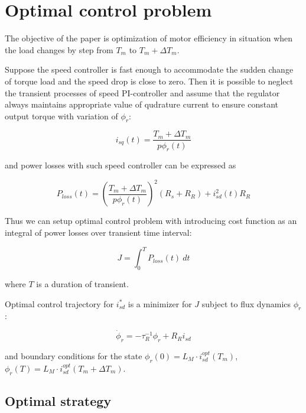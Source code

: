 \documentclass[journal]{IEEEtran}
\begin{document}
\section{Optimal control problem}

The objective of the paper is optimization of motor efficiency in situation when the load changes by step from $T_m$ to $T_m + \Delta T_m$.

Suppose the speed controller is fast enough to accommodate the sudden change of torque load and the speed drop is close to zero. Then it is possible to neglect the transient processes of speed PI-controller and assume that the regulator always maintains appropriate value of qudrature current to ensure constant output torque with variation of $\phi_r$:

\begin{equation}\label{eq:speed_ctrl}
 i_{sq}(t) = \frac{T_m+\Delta T_m}{p \phi_r(t)} 
\end{equation}

and power losses with such speed controller can be expressed as

\begin{equation}\label{eq:P_loss}
P_{loss}(t) = \left ( \frac{T_m+\Delta T_m}{p \phi_r(t)} \right )^2 (R_s + R_R) + i_{sd}^2(t) R_R
\end{equation}

Thus we can setup optimal control problem with introducing cost function as an integral of power losses over transient time interval: 

\begin{equation}\label{eq:cost}
J = \int_0^T P_{loss}(t) ~ dt
\end{equation}

where $T$ is a duration of transient.

Optimal control trajectory for $i_{sd}^*$ is a minimizer for $J$ subject to flux dynamics $\phi_r$:

\begin{equation}\label{eq:flux}
\dot \phi_r = -\tau_R^{-1} \phi_r + R_R i_{sd}
\end{equation}

and boundary conditions for the state $\phi_r(0) = L_M \cdot i_{sd}^{opt}(T_m)$, $\phi_r(T) = L_M \cdot i_{sd}^{opt}(T_m+\Delta T_m)$.

\subsection{Optimal strategy}
\end{document}
